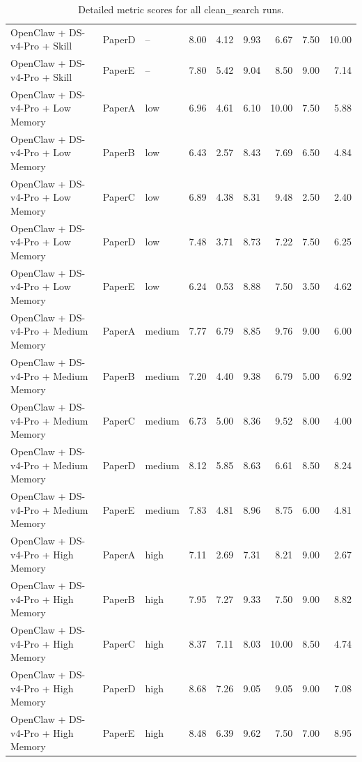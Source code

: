 \documentclass[10pt]{article}
\begin{document}
\begin{table}[t]
\begin{tabular}{lllrrrrrr}
OpenClaw + DS-v4-Pro + Skill & PaperD & -- & 8.00 & 4.12 & 9.93 & 6.67 & 7.50 & 10.00 \\
OpenClaw + DS-v4-Pro + Skill & PaperE & -- & 7.80 & 5.42 & 9.04 & 8.50 & 9.00 & 7.14 \\
OpenClaw + DS-v4-Pro + Low Memory & PaperA & low & 6.96 & 4.61 & 6.10 & 10.00 & 7.50 & 5.88 \\
OpenClaw + DS-v4-Pro + Low Memory & PaperB & low & 6.43 & 2.57 & 8.43 & 7.69 & 6.50 & 4.84 \\
OpenClaw + DS-v4-Pro + Low Memory & PaperC & low & 6.89 & 4.38 & 8.31 & 9.48 & 2.50 & 2.40 \\
OpenClaw + DS-v4-Pro + Low Memory & PaperD & low & 7.48 & 3.71 & 8.73 & 7.22 & 7.50 & 6.25 \\
OpenClaw + DS-v4-Pro + Low Memory & PaperE & low & 6.24 & 0.53 & 8.88 & 7.50 & 3.50 & 4.62 \\
OpenClaw + DS-v4-Pro + Medium Memory & PaperA & medium & 7.77 & 6.79 & 8.85 & 9.76 & 9.00 & 6.00 \\
OpenClaw + DS-v4-Pro + Medium Memory & PaperB & medium & 7.20 & 4.40 & 9.38 & 6.79 & 5.00 & 6.92 \\
OpenClaw + DS-v4-Pro + Medium Memory & PaperC & medium & 6.73 & 5.00 & 8.36 & 9.52 & 8.00 & 4.00 \\
OpenClaw + DS-v4-Pro + Medium Memory & PaperD & medium & 8.12 & 5.85 & 8.63 & 6.61 & 8.50 & 8.24 \\
OpenClaw + DS-v4-Pro + Medium Memory & PaperE & medium & 7.83 & 4.81 & 8.96 & 8.75 & 6.00 & 4.81 \\
OpenClaw + DS-v4-Pro + High Memory & PaperA & high & 7.11 & 2.69 & 7.31 & 8.21 & 9.00 & 2.67 \\
OpenClaw + DS-v4-Pro + High Memory & PaperB & high & 7.95 & 7.27 & 9.33 & 7.50 & 9.00 & 8.82 \\
OpenClaw + DS-v4-Pro + High Memory & PaperC & high & 8.37 & 7.11 & 8.03 & 10.00 & 8.50 & 4.74 \\
OpenClaw + DS-v4-Pro + High Memory & PaperD & high & 8.68 & 7.26 & 9.05 & 9.05 & 9.00 & 7.08 \\
OpenClaw + DS-v4-Pro + High Memory & PaperE & high & 8.48 & 6.39 & 9.62 & 7.50 & 7.00 & 8.95 \\
\bottomrule
\end{tabular}
\caption{Detailed metric scores for all clean\_search runs.}
\label{tab:clean-search-full-metrics}
\end{table}
\end{document}
